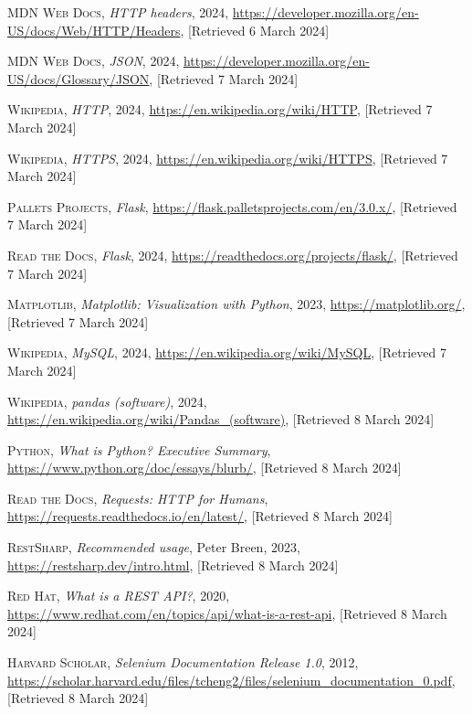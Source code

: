 \documentclass{thesis-ekf}
\theoremstyle{definition}
\theoremstyle{remark}
\begin{document}
\begin{thebibliography}{2}
\textsc{MDN Web Docs}, 
\emph{HTTP headers}, 2024,
\url{https://developer.mozilla.org/en-US/docs/Web/HTTP/Headers}, [Retrieved 6 March 2024]

\textsc{MDN Web Docs},
\emph{JSON}, 2024,
\url{https://developer.mozilla.org/en-US/docs/Glossary/JSON}, [Retrieved 7 March 2024]

\textsc{Wikipedia},
\emph{HTTP}, 2024,
\url{https://en.wikipedia.org/wiki/HTTP}, [Retrieved 7 March 2024]

\textsc{Wikipedia},
\emph{HTTPS}, 2024,
\url{https://en.wikipedia.org/wiki/HTTPS}, [Retrieved 7 March 2024]

\textsc{Pallets Projects},
\emph{Flask}, 
\url{https://flask.palletsprojects.com/en/3.0.x/}, [Retrieved 7 March 2024]

\textsc{Read the Docs},
\emph{Flask}, 2024,
\url{https://readthedocs.org/projects/flask/}, [Retrieved 7 March 2024]

\textsc{Matplotlib}, 
\emph{Matplotlib: Visualization with Python}, 2023,
\url{https://matplotlib.org/}, [Retrieved 7 March 2024]

\textsc{Wikipedia},
\emph{MySQL}, 2024,
\url{https://en.wikipedia.org/wiki/MySQL}, [Retrieved 7 March 2024]

\textsc{Wikipedia},
\emph{pandas (software)}, 2024,
\url{https://en.wikipedia.org/wiki/Pandas_(software)}, [Retrieved 8 March 2024]

\textsc{Python},
\emph{What is Python? Executive Summary},
\url{https://www.python.org/doc/essays/blurb/}, [Retrieved 8 March 2024]

\textsc{Read the Docs},
\emph{Requests: HTTP for Humans},
\url{https://requests.readthedocs.io/en/latest/}, [Retrieved 8 March 2024]

\textsc{RestSharp},
\emph{Recommended usage}, Peter Breen, 2023,
\url{https://restsharp.dev/intro.html}, [Retrieved 8 March 2024]

\textsc{Red Hat},
\emph{What is a REST API?}, 2020, 
\url{https://www.redhat.com/en/topics/api/what-is-a-rest-api}, [Retrieved 8 March 2024]

\textsc{Harvard Scholar},
\emph{Selenium Documentation Release 1.0}, 2012, 
\url{https://scholar.harvard.edu/files/tcheng2/files/selenium_documentation_0.pdf}, [Retrieved 8 March 2024]


\end{thebibliography}
\end{document}
